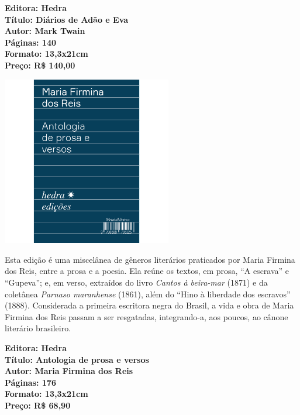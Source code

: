 \vfill

\noindent\begin{minipage}[c]{1\linewidth}
{\small\textbf{
\hspace*{-.1cm}Editora: Hedra\\
Título: Diários de Adão e Eva\\
Autor: Mark Twain\\ 
Páginas: 140\\
Formato: 13,3x21cm\\
Preço: R\$ 140,00\\
}}
\end{minipage}

\pagebreak

\begin{center}
\hspace*{.5cm}\includegraphics[width=74mm]{./grid/firmina.jpg}
\end{center}

\hspace*{-7cm}\hrulefill\hspace*{-7cm}

\medskip

\noindent{}Esta edição é uma miscelânea de gêneros literários praticados por Maria Firmina dos Reis, entre a prosa e a poesia. Ela reúne os textos, em prosa, ``A escrava'' e ``Gupeva''; e, em verso, extraídos do livro \textit{Cantos à beira-mar} (1871) e da coletânea \textit{Parnaso maranhense} (1861), além do ``Hino à liberdade dos escravos'' (1888). Considerada a primeira escritora negra do Brasil, a vida e obra de Maria Firmina dos Reis passam a ser resgatadas, integrando-a, aos poucos, ao cânone literário brasileiro.

\vfill

\noindent\begin{minipage}[c]{.5\linewidth}
{\small\textbf{
\hspace*{-.1cm}Editora: Hedra\\
Título: Antologia de prosa e versos\\
Autor: Maria Firmina dos Reis\\ 
Páginas: 176\\
Formato: 13,3x21cm\\
Preço: R\$ 68,90\\
}}
\end{minipage}

